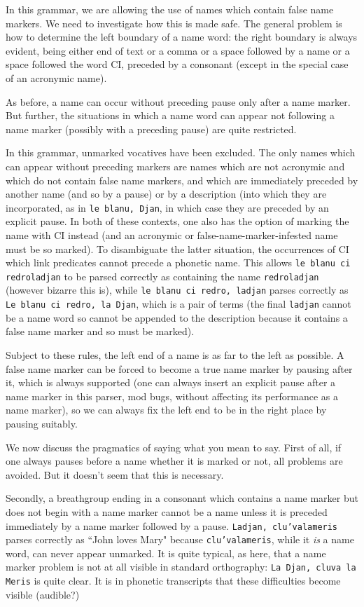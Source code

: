 \documentclass[12pt]{article}
\begin{document}
In this grammar, we are allowing the use of names which contain false name markers.   We need to investigate how this is made safe.   The general problem is how to determine the left
boundary of a name word:  the right boundary is always evident, being either end of text or a comma or a space followed by a name or a space followed the word CI, preceded by a consonant (except in the special case of an acronymic name).

As before, a name can occur without preceding pause only after a name marker.   But further, the situations in which a name word can appear not following a name marker (possibly with a preceding pause) are quite restricted.

In this grammar, unmarked vocatives have been excluded.   The only names which can appear without preceding markers are names which are not acronymic and which do not contain false name markers, and which are immediately preceded by another name (and so by a pause) or by a description (into which they are incorporated, as in {\tt le blanu, Djan}, in which case
they are preceded by an explicit pause.  In both of these contexts, one also has the option of marking the name with CI instead (and an acronymic or false-name-marker-infested name must be so marked).   To disambiguate the latter situation, the occurrences of
CI which link predicates cannot precede a phonetic name.  This allows {\tt le blanu ci redroladjan} to be parsed correctly as containing the name {\tt redroladjan} (however bizarre this is),
while {\tt le blanu ci redro, ladjan} parses correctly as {\tt Le blanu ci redro, la Djan}, which is a pair of terms (the final {\tt ladjan} cannot be a name word so cannot be appended to the description because it contains a false name marker and so must be marked).

Subject to these rules, the left end of a name is as far to the left as possible.  A false name marker can be forced to become a true name marker by pausing after it, which is always supported (one can always insert an explicit pause after a name marker in this parser, mod bugs, without affecting its performance as a name marker), so we can always fix the left end to be in the right place by pausing suitably.

We now discuss the pragmatics of saying what you mean to say.   First of all, if one always pauses before a name whether it is marked or not, all problems are avoided.    But it doesn't seem that this is necessary.

Secondly,
a breathgroup ending in a consonant which contains a name marker but does not begin with a name marker cannot be a name unless it is preceded immediately by a name marker followed by a pause.  {\tt Ladjan, clu'valameris}  parses correctly as ``John loves Mary" because {\tt clu'valameris}, while it {\em is} a name word, can never appear unmarked.   It is quite typical, as here, that a name marker problem is not at all visible in standard orthography:  {\tt La Djan, cluva la Meris} is quite clear.   It is in phonetic transcripts that these difficulties become visible (audible?)
\end{document}
